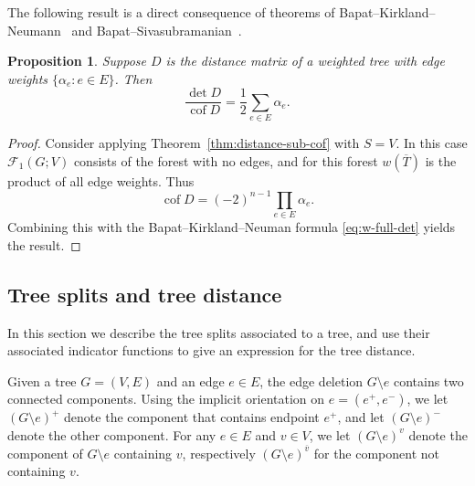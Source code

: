 \documentclass{amsart}
\newtheorem{prop}[thm]{Proposition}
\theoremstyle{definition}
\DeclareMathOperator{\cof}{cof}
\newcommand{\trees}{\mathcal{F}_1}
\begin{document}
The following result is a direct consequence of theorems of Bapat--Kirkland--Neumann~\cite{bapat-kirkland-neumann} and Bapat--Sivasubramanian~\cite{bapat-sivasubramanian}.

\begin{prop}
\label{prop:full-det-cof-ratio}
Suppose $D$ is the distance matrix of a weighted tree with edge weights $\{\alpha_e : e \in E\}$.
Then
\[
	\frac{\det D}{\cof D} = \frac1{2} \sum_{e \in E} \alpha_e .
\]
\end{prop}
\begin{proof}
Consider applying Theorem~\ref{thm:distance-sub-cof} with $S = V$.
In this case $\trees(G; V)$ consists of the forest with no edges, and for this forest $w(\overline{T})$ is the product of all edge weights.
Thus
\[
	\cof D = (-2)^{n - 1} \prod_{e \in E} \alpha_e .
\]
Combining this with the Bapat--Kirkland--Neuman formula \eqref{eq:w-full-det} yields the result.
\end{proof}

\subsection{Tree splits and tree distance}
\label{sec:tree-splits}

In this section we describe the tree splits associated to a tree, and use their associated indicator functions to give an expression for the tree distance.

Given a tree $G = (V,E)$ and an edge $e \in E$, the edge deletion $G \setminus e$ contains two connected components.
Using the implicit orientation on $e = (e^+,e^-)$,
we let $(G \setminus e)^+$ denote the component that contains endpoint $e^+$, and let $(G\setminus e)^-$ denote the other component.
For any $e \in E$ and $v \in V$,
we let
$(G \setminus e)^{v}$ denote the component of $G\setminus e$ containing $v$,
respectively $(G\setminus e)^{\overline v}$ for the component not containing $v$.

\end{document}
